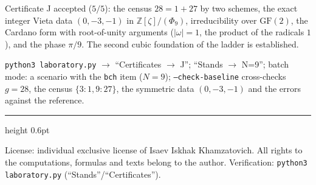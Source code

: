\documentclass[11pt,a4paper]{article}
\theoremstyle{plain}
\theoremstyle{definition}
\theoremstyle{remark}
\newcommand{\ZZ}{\mathbb{Z}}
\begin{document}
\begin{statusbox}[summary]
Certificate J accepted ($5/5$): the census $28=1+27$ by two
schemes, the exact integer Vieta data $(0,-3,-1)$ in
$\ZZ[\zeta]/(\Phi_9)$, irreducibility over $\mathrm{GF}(2)$, the
Cardano form with root-of-unity arguments ($|\omega|=1$, the
product of the radicals $1$), and the phase $\pi/9$. The second
cubic foundation of the ladder is established.
\end{statusbox}

\begin{verifybox}
\texttt{python3 laboratory.py} $\to$ ``Certificates $\to$ J'';
``Stands $\to$ N=9''; batch mode: a scenario with the
\texttt{bch} item ($N=9$); \texttt{--check-baseline} cross-checks
$g=28$, the census $\{3\colon1,9\colon27\}$, the symmetric data
$(0,-3,-1)$ and the errors against the reference.
\end{verifybox}

\vfill
{\color{linkblue}\hrule height 0.6pt}
\vspace{0.5em}
{\small\color{gray}
License: individual exclusive license of Isaev Iskhak Khamzatovich.
All rights to the computations, formulas and texts belong to the author.
Verification: \texttt{python3 laboratory.py} (``Stands''/``Certificates'').
}
\end{document}
